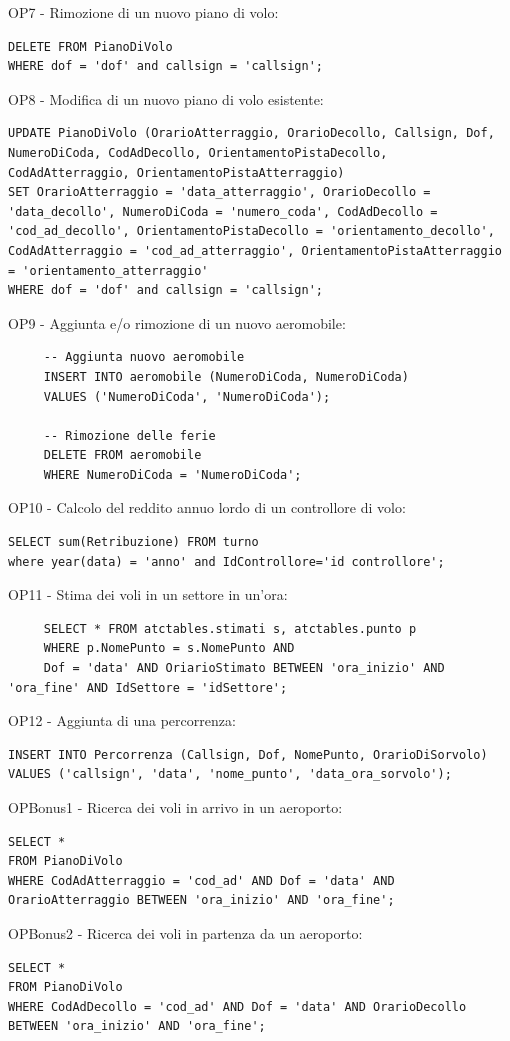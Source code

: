 OP7 - Rimozione di un nuovo piano di volo:
\begin{lstlisting}
DELETE FROM PianoDiVolo
WHERE dof = 'dof' and callsign = 'callsign';
\end{lstlisting}

OP8 - Modifica di un nuovo piano di volo esistente:
\begin{lstlisting}
UPDATE PianoDiVolo (OrarioAtterraggio, OrarioDecollo, Callsign, Dof, NumeroDiCoda, CodAdDecollo, OrientamentoPistaDecollo, CodAdAtterraggio, OrientamentoPistaAtterraggio)
SET OrarioAtterraggio = 'data_atterraggio', OrarioDecollo = 'data_decollo', NumeroDiCoda = 'numero_coda', CodAdDecollo = 'cod_ad_decollo', OrientamentoPistaDecollo = 'orientamento_decollo', CodAdAtterraggio = 'cod_ad_atterraggio', OrientamentoPistaAtterraggio = 'orientamento_atterraggio'
WHERE dof = 'dof' and callsign = 'callsign';

\end{lstlisting}

OP9 - Aggiunta e/o rimozione di un nuovo aeromobile:
\begin{lstlisting}
     -- Aggiunta nuovo aeromobile
     INSERT INTO aeromobile (NumeroDiCoda, NumeroDiCoda)
     VALUES ('NumeroDiCoda', 'NumeroDiCoda');
     
     -- Rimozione delle ferie
     DELETE FROM aeromobile
     WHERE NumeroDiCoda = 'NumeroDiCoda';
     \end{lstlisting}

OP10 - Calcolo del reddito annuo lordo di un controllore di volo:
\begin{lstlisting}
SELECT sum(Retribuzione) FROM turno
where year(data) = 'anno' and IdControllore='id controllore';
\end{lstlisting}

OP11 - Stima dei voli in un settore in un'ora:
\begin{lstlisting}
     SELECT * FROM atctables.stimati s, atctables.punto p
     WHERE p.NomePunto = s.NomePunto AND
     Dof = 'data' AND OriarioStimato BETWEEN 'ora_inizio' AND 'ora_fine' AND IdSettore = 'idSettore';
\end{lstlisting}

OP12 - Aggiunta di una percorrenza:
\begin{lstlisting}
INSERT INTO Percorrenza (Callsign, Dof, NomePunto, OrarioDiSorvolo)
VALUES ('callsign', 'data', 'nome_punto', 'data_ora_sorvolo');
\end{lstlisting}


OPBonus1 - Ricerca dei voli in arrivo in un aeroporto:
\begin{lstlisting}
SELECT *
FROM PianoDiVolo
WHERE CodAdAtterraggio = 'cod_ad' AND Dof = 'data' AND OrarioAtterraggio BETWEEN 'ora_inizio' AND 'ora_fine';
\end{lstlisting}

OPBonus2 - Ricerca dei voli in partenza da un aeroporto:
\begin{lstlisting}
SELECT *
FROM PianoDiVolo
WHERE CodAdDecollo = 'cod_ad' AND Dof = 'data' AND OrarioDecollo BETWEEN 'ora_inizio' AND 'ora_fine';
\end{lstlisting}
